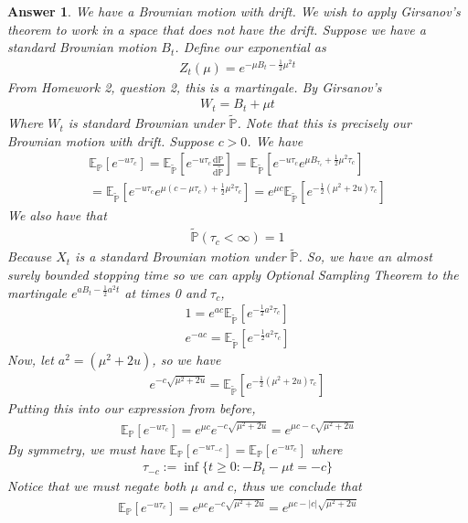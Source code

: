 \documentclass[12pt]{article}
\theoremstyle{colon}
\newtheorem*{answer}{Answer}
\begin{document}
\begin{answer}
  We have a Brownian motion with drift. We wish to apply Girsanov's theorem to work in a space that does not have the drift. Suppose we have a standard Brownian motion $B_t$. Define our exponential as
  \begin{gather*}
    Z_t(\mu) = e^{-\mu B_t - \frac{1}{2}\mu^2 t}
  \end{gather*}
  From Homework 2, question 2, this is a martingale. By Girsanov's
  \begin{gather*}
    W_t = B_t + \mu t
  \end{gather*}
  Where $W_t$ is standard Brownian under $\tilde{\mathbb{P}}$. Note that this is precisely our Brownian motion with drift. Suppose $c > 0$. We have
  \begin{gather*}
    \mathbb{E}_{\mathbb{P}}[e^{-u \tau_c}] = \mathbb{E}_{\tilde{\mathbb{P}}}[ e^{-u \tau_c} \frac{ \text{d} \mathbb{P}}{\text{d} \mathbb{\tilde{P}}} ] = \mathbb{E}_{\tilde{\mathbb{P}}}[ e^{-u \tau_c} e^{\mu B_{\tau_c} + \frac{1}{2} \mu^2 \tau_c} ] \\
    = \mathbb{E}_{\tilde{\mathbb{P}}}[ e^{-u \tau_c} e^{\mu (c - \mu \tau_c) + \frac{1}{2} \mu^2 \tau_c} ] = e^{\mu c} \mathbb{E}_{\tilde{\mathbb{P}}}[ e^{-\frac{1}{2} (\mu^2 + 2u) \tau_c} ]
  \end{gather*}
  We also have that
  \begin{gather*}
    \tilde{\mathbb{P}}( \tau_c < \infty) = 1
  \end{gather*}
  Because $X_t$ is a standard Brownian motion under $\tilde{\mathbb{P}}$. So, we have an almost surely bounded stopping time so we can apply Optional Sampling Theorem to the martingale $e^{a B_t - \frac{1}{2} a^2t}$ at times 0 and $\tau_c$,
  \begin{gather*}
    1 = e^{a c} \mathbb{E}_{\tilde{\mathbb{P}}}[ e^{-\frac{1}{2} a^2 \tau_c} ] \\
    e^{-a c} = \mathbb{E}_{\tilde{\mathbb{P}}}[ e^{-\frac{1}{2} a^2 \tau_c} ]
  \end{gather*}
  Now, let $a^2 = (\mu^2 + 2u)$, so we have
  \begin{gather*}
    e^{- c \sqrt{\mu^2 + 2u}} = \mathbb{E}_{\tilde{\mathbb{P}}}[ e^{-\frac{1}{2} (\mu^2 + 2u) \tau_c} ]
  \end{gather*}
  Putting this into our expression from before,
  \begin{gather*}
    \mathbb{E}_{\mathbb{P}}[e^{-u \tau_c}] = e^{\mu c} e^{- c \sqrt{\mu^2 + 2u}} = e^{\mu c - c \sqrt{\mu^2 + 2u}}
  \end{gather*}
  By symmetry, we must have $\mathbb{E}_{\mathbb{P}}[e^{-u \tau_{-c}}] = \mathbb{E}_{\mathbb{P}}[e^{-u \tau_c}]$ where
  \begin{gather*}
    \tau_{-c} := \inf \{ t \geq 0 : -B_t - \mu t = -c \}
  \end{gather*}
  Notice that we must negate both $\mu$ and $c$, thus we conclude that
  \begin{gather*}
    \mathbb{E}_{\mathbb{P}}[e^{-u \tau_c}] = e^{\mu c} e^{- c \sqrt{\mu^2 + 2u}} = e^{\mu c - \lvert c \rvert \sqrt{\mu^2 + 2u}}
  \end{gather*}
\end{answer}
\end{document}
